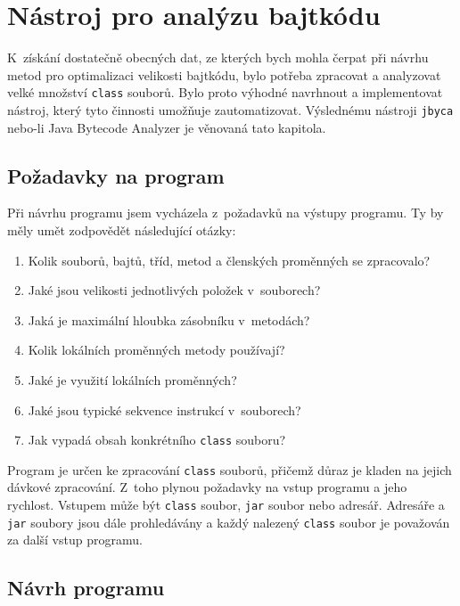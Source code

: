 \chapter{Nástroj pro analýzu bajtkódu}\label{Jbyca}

K~získání dostatečně obecných dat, ze kterých bych mohla čerpat při návrhu metod pro optimalizaci velikosti bajtkódu, bylo potřeba zpracovat a analyzovat velké množství \texttt{class} souborů. Bylo proto výhodné navrhnout a implementovat nástroj, který tyto činnosti umožňuje zautomatizovat. Výslednému nástroji \texttt{jbyca} nebo-li Java Bytecode Analyzer je věnovaná tato kapitola.

\section{Požadavky na program}\label{Jbyca:Requirements}

Při návrhu programu jsem vycházela z~požadavků na výstupy programu.
Ty by měly umět zodpovědět následující otázky: 

\begin{enumerate}
\setlength{\itemsep}{0pt}
\setlength{\parskip}{0pt}
\item Kolik souborů, bajtů, tříd, metod a členských proměnných se zpracovalo? 
\item Jaké jsou velikosti jednotlivých položek v~souborech? 
\item Jaká je maximální hloubka zásobníku v~metodách?
\item Kolik lokálních proměnných metody používají?
\item Jaké je využití lokálních proměnných? 
\item Jaké jsou typické sekvence instrukcí v~souborech?
\item Jak vypadá obsah konkrétního \texttt{class} souboru? 
\end{enumerate}

Program je určen ke zpracování \texttt{class} souborů, přičemž důraz je kladen na jejich dávkové zpracování. Z~toho plynou požadavky na vstup programu a jeho rychlost. Vstupem může být \texttt{class} soubor, \texttt{jar} soubor nebo adresář. Adresáře a \texttt{jar} soubory jsou dále prohledávány a každý nalezený \texttt{class} soubor je považován za další vstup programu. 

\section{Návrh programu}\label{Jbyca:Design}

